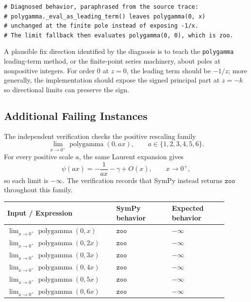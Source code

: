 \documentclass[11pt]{article}
\begin{document}
\begin{lstlisting}[style=bugpython]
# Diagnosed behavior, paraphrased from the source trace:
# polygamma._eval_as_leading_term() leaves polygamma(0, x)
# unchanged at the finite pole instead of exposing -1/x.
# The limit fallback then evaluates polygamma(0, 0), which is zoo.
\end{lstlisting}

A plausible fix direction identified by the diagnosis is to teach the \texttt{polygamma} leading-term method, or the finite-point series machinery, about poles at nonpositive integers. For order \(0\) at \(z=0\), the leading term should be \(-1/z\); more generally, the implementation should expose the signed principal part at \(z=-k\) so directional limits can preserve the sign.

\subsection{Additional Failing Instances}

The independent verification checks the positive rescaling family
\[
  \lim_{x \to 0^+} \operatorname{polygamma}(0,a x),
  \qquad a \in \{1,2,3,4,5,6\}.
\]
For every positive scale \(a\), the same Laurent expansion gives
\[
  \psi(a x) = -\frac{1}{a x} - \gamma + O(x),
  \qquad x \to 0^+,
\]
so each limit is \(-\infty\). The verification records that SymPy instead returns \(\mathtt{zoo}\) throughout this family.

\begin{center}
\renewcommand{\arraystretch}{1.3}
\begin{tabular}{@{}>{\raggedright\arraybackslash}p{0.44\linewidth}>{\raggedright\arraybackslash}p{0.23\linewidth}>{\raggedright\arraybackslash}p{0.23\linewidth}@{}}
\toprule
\textbf{Input / Expression} & \textbf{SymPy behavior} & \textbf{Expected behavior} \\
\midrule
\(\lim_{x \to 0^+}\operatorname{polygamma}(0,x)\) & \(\mathtt{zoo}\) & \(-\infty\) \\
\(\lim_{x \to 0^+}\operatorname{polygamma}(0,2x)\) & \(\mathtt{zoo}\) & \(-\infty\) \\
\(\lim_{x \to 0^+}\operatorname{polygamma}(0,3x)\) & \(\mathtt{zoo}\) & \(-\infty\) \\
\(\lim_{x \to 0^+}\operatorname{polygamma}(0,4x)\) & \(\mathtt{zoo}\) & \(-\infty\) \\
\(\lim_{x \to 0^+}\operatorname{polygamma}(0,5x)\) & \(\mathtt{zoo}\) & \(-\infty\) \\
\(\lim_{x \to 0^+}\operatorname{polygamma}(0,6x)\) & \(\mathtt{zoo}\) & \(-\infty\) \\
\bottomrule
\end{tabular}
\end{center}
\end{document}
